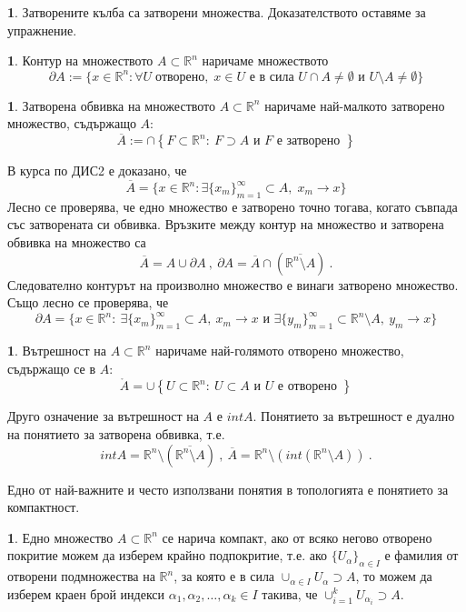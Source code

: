 \documentclass[11pt]{article}
\numberwithin{equation}{section}
\numberwithin{figure}{section}
\numberwithin{table}{section}
\theoremstyle{plain}
\theoremstyle{definition}
\newtheorem{defn}[thm]{\protect\definitionname}
\theoremstyle{remark}
\theoremstyle{definition}
\theoremstyle{remark}
\theoremstyle{plain}
\theoremstyle{definition}
\theoremstyle{definition}
\newtheorem{example}[thm]{\protect\examplename}
\theoremstyle{plain}
\theoremstyle{plain}
\theoremstyle{plain}
\theoremstyle{definition}
\theoremstyle{plain}
\providecommand{\definitionname}{Дефиниция}
\providecommand{\examplename}{Пример}
\newcommand*{\R}{\mathbb{R}}
\begin{document}
\begin{example}
Затворените кълба са затворени множества. Доказателството оставяме за упражнение.
\end{example}

\begin{defn}
Контур на множеството $A \subset \R^n$ наричаме множеството
$$\partial A := \{ x\in \R^n : \forall U \; \text{отворено}, \; x\in U \mbox{ е в сила } U \cap A \neq \emptyset \mbox{ и } U\setminus A \neq \emptyset \}$$
\end{defn}

\begin{defn}
Затворена обвивка на множеството $A \subset \R^n$ наричаме най-малкото затворено множество, съдържащо $A$:
$$\overline{A} := \cap \left\{ F \subset \R^n : \ F \supset A  \mbox{ и } F  \mbox{ е затворено }\right\}$$
\end{defn}

В курса по ДИС2 е доказано, че
$$\overline{A} = \{x\in\R^n: \exists \{x_m\}_{m=1}^\infty \subset A,\; x_m \rightarrow x \}$$
Лесно се проверява, че едно множество е затворено точно тогава, когато съвпада със затворената си обвивка. Връзките между контур на множество и затворена обвивка на множество са
$$\overline{A}= A \cup \partial A \ , \ \partial A =\overline{A} \cap \left(\overline{\R^n\setminus A}\right) \ .$$
Следователно контурът на произволно множество е винаги затворено множество. Също лесно се проверява, че
$$\partial A = \{x \in \R^n : \ \exists \{x_m\}_{m=1}^\infty \subset A, \ x_m \rightarrow x  \mbox{ и } \exists \{y_m\}_{m=1}^\infty \subset \R^n\setminus A, \  y_m \rightarrow x\}$$

\begin{defn}
Вътрешност на $A\subset\R^n$ наричаме най-голямото отворено множество, съдържащо се в $A$:
$$\mathring{A} = \cup \left\{ U \subset \R^n : \ U \subset A  \mbox{ и } U  \mbox{ е отворено }\right\}$$
\end{defn}

Друго означение за вътрешност на $A$ е $int A$. Понятието за вътрешност е дуално на понятието за затворена обвивка, т.е.
$$int{A} = \R^n \setminus \left(\overline{\R^n\setminus A}\right) \ , \ \overline{A}=
\R^n \setminus \left(int{(\R^n\setminus A)}\right) \ .$$

Едно от най-важните и често използвани понятия в топологията е понятието за компактност.
\begin{defn}
Едно множество $A\subset \R^n$ се нарича компакт, ако от всяко негово отворено покритие можем да изберем крайно подпокритие, т.е. ако $\{U_\alpha\}_{\alpha \in I}$ е фамилия от отворени подмножества на $\R^n$, за която е в сила $\cup_{\alpha\in I} U_\alpha \supset A$, то можем да изберем краен брой индекси $\alpha_1, \alpha_2, \dots , \alpha_k \in I$ такива, че $\cup_{i=1}^k U_{\alpha_i} \supset A$.
\end{defn}
\end{document}
